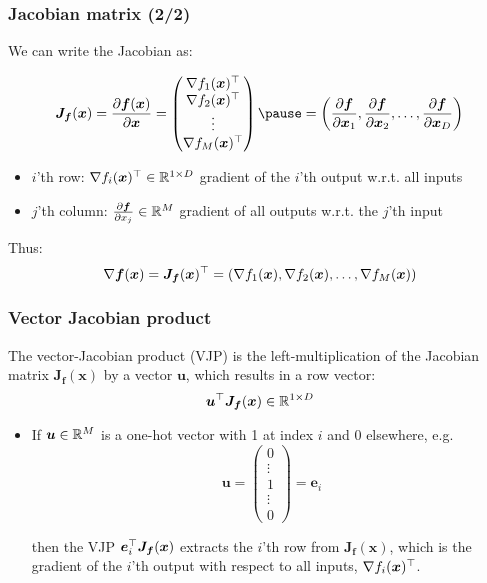 \documentclass[smaller]{beamer}
\begin{document}
\begin{frame}
  \frametitle{Jacobian matrix (2/2)}\pause

  We can write the Jacobian as:\pause

  \begin{equation}
    \bm J_{\bm f}(\bm x) = \pd{\bm f(\bm x)}{\bm x} =
    \begin{pmatrix}
    \nabla f_1(\bm x)\tr \\
    \nabla f_2(\bm x)\tr \\
    \vdots \\
    \nabla f_M(\bm x)\tr 
    \end{pmatrix} \pause = \lt( \pd{\bm f}{\bm x_1}, \pd{\bm f}{\bm x_2}, \ldots, \pd{\bm f}{\bm x_D} \rt)
  \end{equation}
\pause

\begin{itemize}
  \item $i$'th row: $\nabla f_i(\bm x)^{\top} \in \mathbb{R}^{1\times D}$ gradient of the $i$'th output w.r.t. all inputs
  \item $j$'th column: $\frac{\partial{\bm f}}{\partial{x_j}} \in\mathbb{R}^{M}$ gradient of all outputs w.r.t. the $j$'th input
\end{itemize}
  
\pause

Thus:
\begin{equation}
  \nabla \bm f(\bm x) = \bm J_{\bm f}(\bm x)^{\top} = \left( \nabla f_1(\bm x), \nabla f_2(\bm x), \ldots, \nabla f_M(\bm x) \right)
\end{equation}
\end{frame}

\begin{frame}
  \frametitle{Vector Jacobian product}\pause

  The vector-Jacobian product (VJP) is the left-multiplication of the Jacobian matrix $\bm J_{\bm f}(\bm x)$ by a vector $\bm u$, which results in a row vector:\pause
  \begin{equation}
    \bm u ^{\top} \bm J_{\bm f}(\bm x) \in \mathbb{R}^{1\times D}
  \end{equation}

  \pause

  \begin{itemize}
    \item If $\bm u\in \mathbb{R}^{M}$ is a one-hot vector with 1 at index $i$ and 0 elsewhere, e.g.
      \begin{equation}
        \bm u = 
        \begin{pmatrix}
          0 \\ \vdots \\ 1 \\ \vdots \\ 0
        \end{pmatrix} = \bm e_i
      \end{equation}

        then the VJP $\bm e_i^{\top} \bm J_{\bm f}(\bm x)$ extracts the $i$'th row from $\bm J_{\bm f}(\bm x)$, which is the gradient of the $i$'th output with respect to all inputs, $\nabla f_i(\bm x)^{\top}$.

  \end{itemize}
\end{frame}
\end{document}

